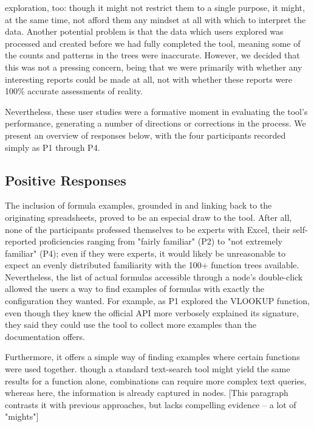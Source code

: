 \documentclass[conference]{IEEEtran}
\begin{document}
	exploration, too: though it might not restrict them to a single purpose, it
	might, at the same time, not afford them any mindset at all with which to
	interpret the data. Another potential problem is that the data which users
	explored was processed and created before we had fully completed the tool,
	meaning some of the counts and patterns in the trees were inaccurate. However,
	we decided that this was not a pressing concern, being that we were primarily
	with whether any interesting reports could be made at all, not with whether
	these reports were 100\% accurate assessments of reality. \par Nevertheless,
	these user studies were a formative moment in evaluating the tool's
	performance, generating a number of directions or corrections in the process.
	We present an overview of responses below, with the four participants recorded
	simply as P1 through P4. \par \subsection{Positive Responses} The inclusion of
	formula examples, grounded in and linking back to the originating spreadsheets,
	proved to be an especial draw to the tool. After all, none of the participants
	professed themselves to be experts with Excel, their self-reported
	proficiencies ranging from "fairly familiar" (P2) to "not extremely familiar"
	(P4); even if they were experts, it would likely be unreasonable to expect an
	evenly distributed familiarity with the 100+ function trees available.
	Nevertheless, the list of actual formulas accessible through a node's
	double-click allowed the users a way to find examples of formulas with exactly
	the configuration they wanted. For example, as P1 explored the VLOOKUP
	function, even though they knew the official API more verbosely explained its
	signature, they said they could use the tool to collect more examples than the
	documentation offers. \par Furthermore, it offers a simple way of finding
	examples where certain functions were used together. though a standard
	text-search tool might yield the same results for a function alone,
	combinations can require more complex text queries, whereas here, the
	information is already captured in nodes. [This paragraph contrasts it with
	previous approaches, but lacks compelling evidence -- a lot of "mights"] \par
\end{document}
